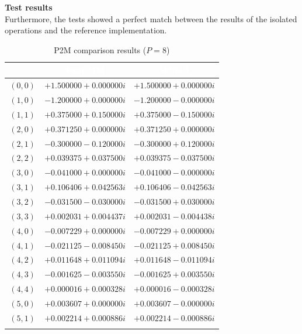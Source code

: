 \documentclass[10pt,dvipsnames,table]{article}
\begin{document}
\vspace{0.8em}
\noindent\textbf{Test results}\\[0.2em]
Furthermore, the tests showed a perfect match between the results of the isolated operations and the reference implementation.

\begin{table}[H]
\centering
\caption{P2M comparison results ($P=8$)}\label{tbl:p2m_results}
\small
\renewcommand{\arraystretch}{1.1}
\begin{tabular}{@{}ccc@{}}
\rowcolor{TableHead}
\textcolor{white}{\textbf{$(l, m)$}} &
\textcolor{white}{\textbf{ExaFMM}} &
\textcolor{white}{\textbf{WSE-3}} \\
\midrule
$(0, 0)$ & $+1.500000 + 0.000000i$ & $+1.500000 + 0.000000i$ \\ \rowcolor{TableRowAlt}
$(1, 0)$ & $-1.200000 + 0.000000i$ & $-1.200000 - 0.000000i$ \\
$(1, 1)$ & $+0.375000 + 0.150000i$ & $+0.375000 - 0.150000i$ \\ \rowcolor{TableRowAlt}
$(2, 0)$ & $+0.371250 + 0.000000i$ & $+0.371250 + 0.000000i$ \\
$(2, 1)$ & $-0.300000 - 0.120000i$ & $-0.300000 + 0.120000i$ \\ \rowcolor{TableRowAlt}
$(2, 2)$ & $+0.039375 + 0.037500i$ & $+0.039375 - 0.037500i$ \\
$(3, 0)$ & $-0.041000 + 0.000000i$ & $-0.041000 - 0.000000i$ \\ \rowcolor{TableRowAlt}
$(3, 1)$ & $+0.106406 + 0.042563i$ & $+0.106406 - 0.042563i$ \\
$(3, 2)$ & $-0.031500 - 0.030000i$ & $-0.031500 + 0.030000i$ \\ \rowcolor{TableRowAlt}
$(3, 3)$ & $+0.002031 + 0.004437i$ & $+0.002031 - 0.004438i$ \\
$(4, 0)$ & $-0.007229 + 0.000000i$ & $-0.007229 + 0.000000i$ \\ \rowcolor{TableRowAlt}
$(4, 1)$ & $-0.021125 - 0.008450i$ & $-0.021125 + 0.008450i$ \\
$(4, 2)$ & $+0.011648 + 0.011094i$ & $+0.011648 - 0.011094i$ \\ \rowcolor{TableRowAlt}
$(4, 3)$ & $-0.001625 - 0.003550i$ & $-0.001625 + 0.003550i$ \\
$(4, 4)$ & $+0.000016 + 0.000328i$ & $+0.000016 - 0.000328i$ \\ \rowcolor{TableRowAlt}
$(5, 0)$ & $+0.003607 + 0.000000i$ & $+0.003607 - 0.000000i$ \\
$(5, 1)$ & $+0.002214 + 0.000886i$ & $+0.002214 - 0.000886i$ \\ \rowcolor{TableRowAlt}

\end{tabular}
\end{table}
\end{document}
